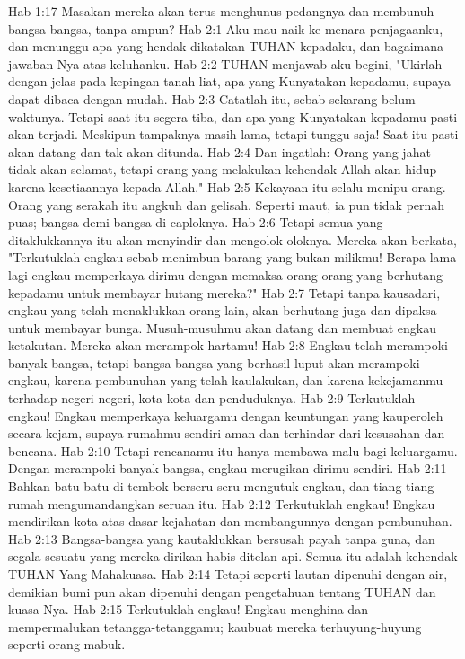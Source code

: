 Hab 1:17  Masakan mereka akan terus menghunus pedangnya dan membunuh bangsa-bangsa, tanpa ampun?
Hab 2:1  Aku mau naik ke menara penjagaanku, dan menunggu apa yang hendak dikatakan TUHAN kepadaku, dan bagaimana jawaban-Nya atas keluhanku.
Hab 2:2  TUHAN menjawab aku begini, "Ukirlah dengan jelas pada kepingan tanah liat, apa yang Kunyatakan kepadamu, supaya dapat dibaca dengan mudah.
Hab 2:3  Catatlah itu, sebab sekarang belum waktunya. Tetapi saat itu segera tiba, dan apa yang Kunyatakan kepadamu pasti akan terjadi. Meskipun tampaknya masih lama, tetapi tunggu saja! Saat itu pasti akan datang dan tak akan ditunda.
Hab 2:4  Dan ingatlah: Orang yang jahat tidak akan selamat, tetapi orang yang melakukan kehendak Allah akan hidup karena kesetiaannya kepada Allah."
Hab 2:5  Kekayaan itu selalu menipu orang. Orang yang serakah itu angkuh dan gelisah. Seperti maut, ia pun tidak pernah puas; bangsa demi bangsa di caploknya.
Hab 2:6  Tetapi semua yang ditaklukkannya itu akan menyindir dan mengolok-oloknya. Mereka akan berkata, "Terkutuklah engkau sebab menimbun barang yang bukan milikmu! Berapa lama lagi engkau memperkaya dirimu dengan memaksa orang-orang yang berhutang kepadamu untuk membayar hutang mereka?"
Hab 2:7  Tetapi tanpa kausadari, engkau yang telah menaklukkan orang lain, akan berhutang juga dan dipaksa untuk membayar bunga. Musuh-musuhmu akan datang dan membuat engkau ketakutan. Mereka akan merampok hartamu!
Hab 2:8  Engkau telah merampoki banyak bangsa, tetapi bangsa-bangsa yang berhasil luput akan merampoki engkau, karena pembunuhan yang telah kaulakukan, dan karena kekejamanmu terhadap negeri-negeri, kota-kota dan penduduknya.
Hab 2:9  Terkutuklah engkau! Engkau memperkaya keluargamu dengan keuntungan yang kauperoleh secara kejam, supaya rumahmu sendiri aman dan terhindar dari kesusahan dan bencana.
Hab 2:10  Tetapi rencanamu itu hanya membawa malu bagi keluargamu. Dengan merampoki banyak bangsa, engkau merugikan dirimu sendiri.
Hab 2:11  Bahkan batu-batu di tembok berseru-seru mengutuk engkau, dan tiang-tiang rumah mengumandangkan seruan itu.
Hab 2:12  Terkutuklah engkau! Engkau mendirikan kota atas dasar kejahatan dan membangunnya dengan pembunuhan.
Hab 2:13  Bangsa-bangsa yang kautaklukkan bersusah payah tanpa guna, dan segala sesuatu yang mereka dirikan habis ditelan api. Semua itu adalah kehendak TUHAN Yang Mahakuasa.
Hab 2:14  Tetapi seperti lautan dipenuhi dengan air, demikian bumi pun akan dipenuhi dengan pengetahuan tentang TUHAN dan kuasa-Nya.
Hab 2:15  Terkutuklah engkau! Engkau menghina dan mempermalukan tetangga-tetanggamu; kaubuat mereka terhuyung-huyung seperti orang mabuk.
